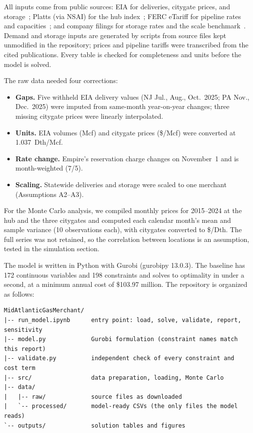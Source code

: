 \documentclass[11pt]{article}
\newcommand{\head}[1]{\needspace{5\baselineskip}\vspace{0.5em}\noindent{\large\bfseries\color{navy}\uline{#1}}\par\vspace{0.15em}}
\begin{document}
\head{Data Collection and Processing}
All inputs come from public sources: EIA for deliveries, citygate prices, and storage~\cite{eia};
Platts (via NSAI) for the hub index~\cite{platts}; FERC eTariff for pipeline rates and
capacities~\cite{ferc}; and company filings for storage rates and the scale
benchmark~\cite{njr,ugi,crestwood}. Demand and storage inputs are generated by scripts from source
files kept unmodified in the repository; prices and pipeline tariffs were transcribed from the cited
publications. Every table is checked for completeness and units before the model is solved.

\smallskip
\noindent The raw data needed four corrections:
\vspace{-0.3\baselineskip}
\begin{itemize}[leftmargin=1cm, label=--]
  \item \textbf{Gaps.} Five withheld EIA delivery values (NJ Jul., Aug., Oct.\ 2025; PA Nov., Dec.\ 2025)
        were imputed from same-month year-on-year changes; three missing citygate prices were linearly
        interpolated.
  \item \textbf{Units.} EIA volumes (Mcf) and citygate prices (\$/Mcf) were converted at 1.037~Dth/Mcf.
  \item \textbf{Rate change.} Empire's reservation charge changes on November~1 and is month-weighted (7/5).
  \item \textbf{Scaling.} Statewide deliveries and storage were scaled to one merchant (Assumptions A2--A3).
\end{itemize}

\noindent For the Monte Carlo analysis, we compiled monthly prices for 2015--2024 at the hub and the three
citygates and computed each calendar month's mean and sample variance (10 observations each), with
citygates converted to \$/Dth. The full series was not retained, so the correlation between locations is
an assumption, tested in the simulation section.

\head{Implementation}
The model is written in Python with Gurobi (gurobipy 13.0.3). The baseline has 172 continuous variables
and 198 constraints and solves to optimality in under a second, at a minimum annual cost of
\$103.97 million. The repository is organized as follows:

{\small
\begin{verbatim}
MidAtlanticGasMerchant/
|-- run_model.ipynb      entry point: load, solve, validate, report, sensitivity
|-- model.py             Gurobi formulation (constraint names match this report)
|-- validate.py          independent check of every constraint and cost term
|-- src/                 data preparation, loading, Monte Carlo
|-- data/
|   |-- raw/             source files as downloaded
|   `-- processed/       model-ready CSVs (the only files the model reads)
`-- outputs/             solution tables and figures
\end{verbatim}}
\end{document}
